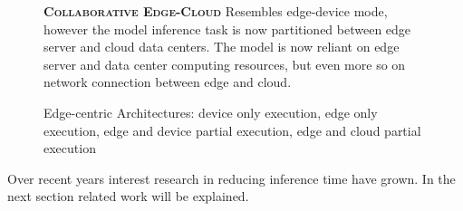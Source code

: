 \begin{figure}
\begin{minipage}{0.3\linewidth}
\begin{figure}
		\end{figure}
	\end{minipage}
	\begin{minipage}{0.5\linewidth}
		\centering
		\captionsetup[subfigure]{justification=centering}
		\begin{figure}
			\centering
		\end{figure}
	\end{minipage}
	\hfill
	\begin{minipage}{0.45\linewidth}
		\textbf{\protect{} \textsc{Collaborative Edge-Cloud}}
		\color{caption-color} \newline
		Resembles edge-device mode, however the model inference task is now partitioned between edge server and cloud data centers. The model is now reliant on edge server and data center computing resources, but even more so on network connection between edge and cloud.
	\end{minipage}
	\caption[Edge-centric Architectures]{Edge-centric Architectures: \protect{} device only execution, \protect{} edge only execution,\protect{} edge and device partial execution, \protect{} edge and cloud partial execution}
	\label{fig:edge_arch}
\end{figure}

Over recent years interest research in reducing inference time have grown. In the next section related work will be explained.  



